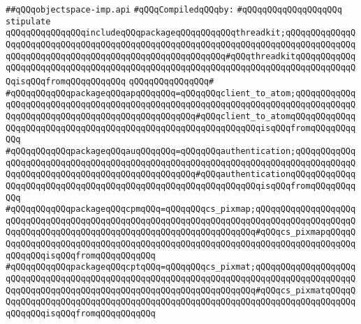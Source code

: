 \label{src/lib/x-kit/widget/space/object/objectspace-imp.api}
\verb|##qQQqobjectspace-imp.api|\newline
\newline
\verb|#qQQqCompiledqQQqby:|\newline
\verb|#qQQqqQQqqQQqqQQqqQQq|\newline
\newline
\newline
\verb|stipulate|\newline
\verb|qQQqqQQqqQQqqQQqincludeqQQqpackageqQQqqQQqqQQqthreadkit;qQQqqQQqqQQqqQQqqQQqqQQqqQQqqQQqqQQqqQQqqQQqqQQqqQQqqQQqqQQqqQQqqQQqqQQqqQQqqQQqqQQqqQQqqQQqqQQqqQQqqQQqqQQqqQQqqQQqqQQqqQQqqQQq#qQQqthreadkitqQQqqQQqqQQqqQQqqQQqqQQqqQQqqQQqqQQqqQQqqQQqqQQqqQQqqQQqqQQqqQQqqQQqqQQqqQQqqQQqqQQqisqQQqfromqQQqqQQqqQQq|\newline
\verb|qQQqqQQqqQQqqQQq#|\newline
\verb|#qQQqqQQqqQQqpackageqQQqapqQQqqQQq=qQQqqQQqclient_to_atom;qQQqqQQqqQQqqQQqqQQqqQQqqQQqqQQqqQQqqQQqqQQqqQQqqQQqqQQqqQQqqQQqqQQqqQQqqQQqqQQqqQQqqQQqqQQqqQQqqQQqqQQqqQQqqQQqqQQqqQQq#qQQqclient_to_atomqQQqqQQqqQQqqQQqqQQqqQQqqQQqqQQqqQQqqQQqqQQqqQQqqQQqqQQqqQQqqQQqisqQQqfromqQQqqQQqqQQq|\newline
\verb|#qQQqqQQqqQQqpackageqQQqauqQQqqQQq=qQQqqQQqauthentication;qQQqqQQqqQQqqQQqqQQqqQQqqQQqqQQqqQQqqQQqqQQqqQQqqQQqqQQqqQQqqQQqqQQqqQQqqQQqqQQqqQQqqQQqqQQqqQQqqQQqqQQqqQQqqQQqqQQqqQQq#qQQqauthenticationqQQqqQQqqQQqqQQqqQQqqQQqqQQqqQQqqQQqqQQqqQQqqQQqqQQqqQQqqQQqqQQqisqQQqfromqQQqqQQqqQQq|\newline
\verb|#qQQqqQQqqQQqpackageqQQqcpmqQQq=qQQqqQQqcs_pixmap;qQQqqQQqqQQqqQQqqQQqqQQqqQQqqQQqqQQqqQQqqQQqqQQqqQQqqQQqqQQqqQQqqQQqqQQqqQQqqQQqqQQqqQQqqQQqqQQqqQQqqQQqqQQqqQQqqQQqqQQqqQQqqQQqqQQqqQQqqQQq#qQQqcs_pixmapqQQqqQQqqQQqqQQqqQQqqQQqqQQqqQQqqQQqqQQqqQQqqQQqqQQqqQQqqQQqqQQqqQQqqQQqqQQqqQQqqQQqisqQQqfromqQQqqQQqqQQq|\newline
\verb|#qQQqqQQqqQQqpackageqQQqcptqQQq=qQQqqQQqcs_pixmat;qQQqqQQqqQQqqQQqqQQqqQQqqQQqqQQqqQQqqQQqqQQqqQQqqQQqqQQqqQQqqQQqqQQqqQQqqQQqqQQqqQQqqQQqqQQqqQQqqQQqqQQqqQQqqQQqqQQqqQQqqQQqqQQqqQQqqQQqqQQq#qQQqcs_pixmatqQQqqQQqqQQqqQQqqQQqqQQqqQQqqQQqqQQqqQQqqQQqqQQqqQQqqQQqqQQqqQQqqQQqqQQqqQQqqQQqqQQqisqQQqfromqQQqqQQqqQQq|\newline
